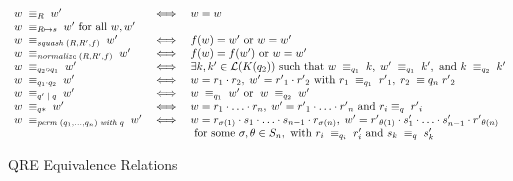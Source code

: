 \documentclass{svproc}
\newcommand{\squash}[3]{\ensuremath{\mathit{squash} \; (#1, #2, #3)}}
\newcommand{\perm}[2]{\ensuremath{\mathit{perm}\; (#1)\; \mathit{with}\; #2}}
\newcommand{\normalize}[3]{\ensuremath{\mathit{normalize} \; (#1, #2, #3)}}
\newcommand{\sep}{\ensuremath{\; | \;}}
\begin{document}
\begin{figure}[t]
  \centering
  \[
    \begin{array}{l@{\quad}l@{\quad}l} 
      w \; \equiv_R \; w' &\iff& w = w \\
      w \; \equiv_{R \mapsto s} \; w' \text{ for all }w, w'\\
      w \; \equiv_{\squash{R}{R'}{f}} \; w' &\iff& f(w) = w'
                                                   \text{ or } w = w' \\
      w \; \equiv_{\normalize{R}{R'}{f}} \; w' &\iff&
                                                      f(w)=f(w') \text{ or }w = w'\\
      w \; \equiv_{q_2 \circ q_1} \; w' &\iff& \exists k, k' \in
                                               \mathcal{L}(K(q_2)) \text{ such that } w \; \equiv_{q_1} \; k, \; w' \;
                                               \equiv_{q_1} \; k', \text{ and } k \; \equiv_{q_2} \; k'\\
      w \; \equiv_{q_1 \cdot q_2} \; w'  &\iff& w = r_1
                                                \cdot r_2, \; w' = {r'}_1 \cdot {r'}_2 \text{ with } r_1 \; \equiv_{q_1}
                                                \; {r'}_1, \; r_2 \; \equiv{q_n} \; {r'}_2\\
      w \; \equiv_{q' \sep q} \; w' &\iff& w \; \equiv_{q_1} \; w'
                                           \text{ or } \; w \; \equiv_{q_2} \; w'\\
      w \; \equiv_{q*} \; w' &\iff& w = r_1 \cdot \ldots \cdot r_n, \; w'
                                    = {r'}_1 \cdot \ldots \cdot {r'}_n \text{ and } r_i \equiv_{q} \; {r'}_i
      \\
      w \; \equiv_{\perm{q_1, \ldots, q_n}{q}} \; w' &\iff& w = r_{\sigma(1)}
                                                            \cdot s_1 \cdot \ldots \cdot s_{n-1} \cdot r_{\sigma(n)}, \;
                                                            w' = {r'}_{\theta(1)} \cdot s'_1 \cdot \ldots \cdot s'_{n-1}
                                                            \cdot {r'}_{\theta(n)} \\
                          & & \text{ for some } \sigma, \theta \in S_n, \text{ with } r_i \;
                              \equiv_{q_i} \; r'_i \text{ and } s_k \; \equiv_{q} \; s'_{k}
    \end{array}
  \]
  \caption{QRE Equivalence Relations}
  \label{fig:relations}
\end{figure}
\end{document}
